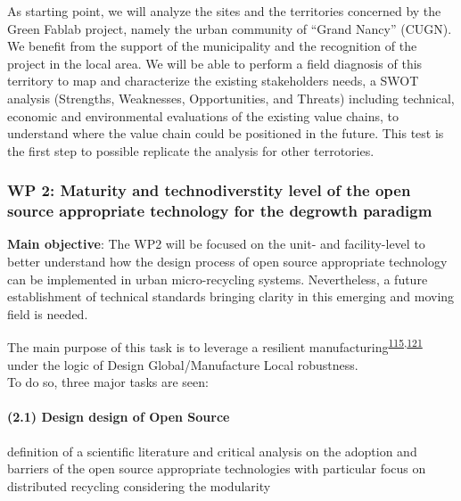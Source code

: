 \documentclass[
  12pt,
  a4paperpaper,
  onecolumn]{article}
\let\oldparagraph\paragraph
\renewcommand{\paragraph}[1]{\oldparagraph{#1}\mbox{}}
\let\paragraph\oldparagraph
\begin{document}
As starting point, we will analyze the sites and the territories
concerned by the Green Fablab project, namely the urban community of
``Grand Nancy'' (CUGN). We benefit from the support of the municipality
and the recognition of the project in the local area. We will be able to
perform a field diagnosis of this territory to map and characterize the
existing stakeholders needs, a SWOT analysis (Strengths, Weaknesses,
Opportunities, and Threats) including technical, economic and
environmental evaluations of the existing value chains, to understand
where the value chain could be positioned in the future. This test is
the first step to possible replicate the analysis for other terrotories.

\small

\normalsize

\hypertarget{wp-2-maturity-and-technodiverstity-level-of-the-open-source-appropriate-technology-for-the-degrowth-paradigm}{%
\subsubsection{WP 2: Maturity and technodiverstity level of the open
source appropriate technology for the degrowth
paradigm}\label{wp-2-maturity-and-technodiverstity-level-of-the-open-source-appropriate-technology-for-the-degrowth-paradigm}}

\textbf{Main objective}: The WP2 will be focused on the unit- and
facility-level to better understand how the design process of open
source appropriate technology can be implemented in urban
micro-recycling systems. Nevertheless, a future establishment of
technical standards bringing clarity in this emerging and moving field
is needed.

The main purpose of this task is to leverage a resilient
manufacturing\textsuperscript{\protect\hyperlink{ref-xu2021e}{115},\protect\hyperlink{ref-zhang2011}{121}}
under the logic of Design Global/Manufacture Local robustness.\\
To do so, three major tasks are seen:

\hypertarget{design-design-of-open-source}{%
\paragraph{(2.1) Design design of Open
Source}\label{design-design-of-open-source}}

definition of a scientific literature and critical analysis on the
adoption and barriers of the open source appropriate technologies with
particular focus on distributed recycling considering the modularity
\end{document}
